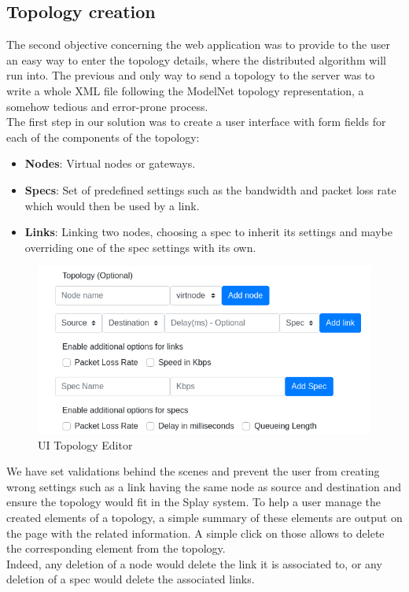 \documentclass{eplmastersthesis}
\begin{document}
      \subsection{Topology creation}

        The second objective concerning the web application was to provide to the
        user an easy way to enter the topology details, where the distributed algorithm
        will run into. The previous and only way to send a topology
        to the server was to write a whole XML file following the ModelNet
        topology representation, a somehow tedious and error-prone process.\\

        The first step in our solution was to create a user interface with
        form fields for each of the components of the topology:

        \begin{itemize}
          \item \textbf{Nodes}: Virtual nodes or gateways.
          \item \textbf{Specs}: Set of predefined settings such as the
          bandwidth and packet loss rate which would then be used by
          a link.
          \item \textbf{Links}: Linking two nodes, choosing a spec to
          inherit its settings and maybe overriding one of the spec settings
          with its own.
        \end{itemize}

        \begin{figure}[H]
          \centering
          \includegraphics[scale=0.6]{figures/editor_topology.png}
          \caption{\label{editor_topology} UI Topology Editor}
        \end{figure}

        We have set validations behind the scenes and
        prevent the user from creating wrong settings such as a link having the
        same node as source and destination and ensure the topology would
        fit in the Splay system. To help a user manage the created
        elements of a topology, a simple summary of these elements are
        output on the page with the related information. A simple click on those
        allows to delete the corresponding element from the topology.\\
        Indeed, any deletion of a node would delete the link it is associated
        to, or any deletion of a spec would delete the associated links.\\
\end{document}
